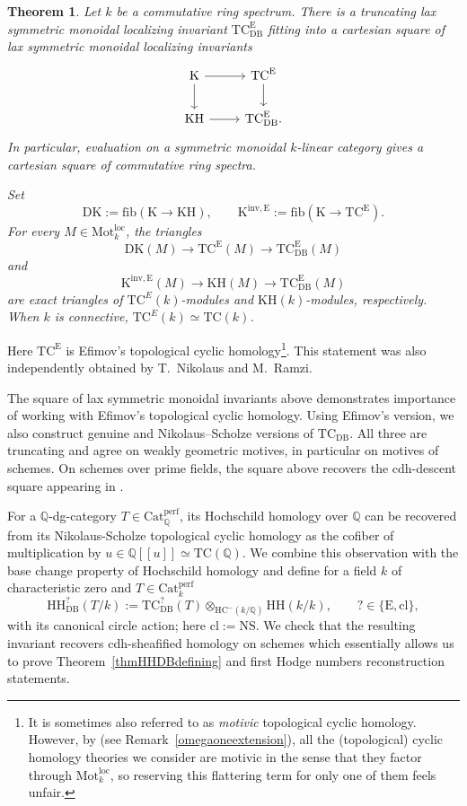 \documentclass{amsart}
\theoremstyle{plain}
\newtheorem{theorem}[prop]{Theorem}
\theoremstyle{definition}
\newcommand{\bbQ}{\mathbb{Q}}
\newcommand{\Catperf}{\mathrm{Cat}^{\mathrm{perf}}}
\newcommand{\Motloc}{\mathrm{Mot}^{\mathrm{loc}}}
\newcommand{\TC}{\mathrm{TC}}
\newcommand{\HH}{\mathrm{HH}}
\newcommand{\HC}{\mathrm{HC}}
\newcommand{\fib}{\mathrm{fib}}
\newcommand{\K}{\mathrm{K}}
\newcommand{\KH}{\mathrm{KH}}
\newcommand{\DK}{\mathrm{DK}}
\newcommand{\DB}{\mathrm{DB}}
\newcommand{\NS}{\mathrm{NS}}
\newcommand{\cl}{\mathrm{cl}}
\begin{document}
\begin{theorem}\label{thmintromultiplicative}
Let $k$ be a
commutative ring spectrum.
There is a truncating lax symmetric monoidal localizing invariant $\TC^{\mathrm E}_{\DB}$ fitting into a cartesian square of lax symmetric monoidal localizing invariants
\[
\begin{tikzcd}
\K\arrow[r]\arrow[d]
  &\TC^{\mathrm E}\arrow[d]\\
\KH\arrow[r]
  &\TC^{\mathrm E}_{\DB}.
\end{tikzcd}
\]
In particular, evaluation on a symmetric monoidal
$k$-linear category gives a cartesian square of commutative ring spectra.

Set
\[
\DK:=\fib(\K\to\KH),
\qquad
\K^{\mathrm{inv},\mathrm E}:=
\fib(\K\to\TC^{\mathrm E}).
\]
For every $M\in\Motloc_k$, the triangles
\[
\DK(M)\longrightarrow
\TC^{\mathrm E}(M)\longrightarrow
\TC^{\mathrm E}_{\DB}(M)
\]
and
\[
\K^{\mathrm{inv},\mathrm E}(M)\longrightarrow
\KH(M)\longrightarrow
\TC^{\mathrm E}_{\DB}(M)
\]
are exact triangles of $\TC^E(k)$-modules and
$\KH(k)$-modules, respectively. When $k$ is connective, $\TC^E(k)\simeq \TC(k)$.
\end{theorem}

Here $\TC^{\mathrm E}$ is Efimov's topological cyclic homology\footnote{It is sometimes also referred to as \emph{motivic} topological cyclic homology. However, by \cite{RSW25} (see Remark~\ref{omegaoneextension}), all the (topological) cyclic homology theories we consider are motivic in the sense that they factor through $\Motloc_k$, so reserving this flattering term for only one of them feels unfair.}.
This statement was also independently obtained by T.~Nikolaus and M.~Ramzi.

The square of lax symmetric monoidal invariants above demonstrates importance of working with Efimov's topological cyclic homology. Using Efimov's version, we also construct genuine and Nikolaus--Scholze versions of $\TC_{\DB}$. All three are truncating and agree on weakly geometric motives, in particular on motives of schemes. On schemes over prime fields, the square above recovers the cdh-descent square appearing in \cite{EM26}. 

For a $\bbQ$-dg-category $T\in\Catperf_\bbQ$, its Hochschild homology over $\bbQ$ can be recovered from its Nikolaus-Scholze topological cyclic homology as the cofiber of multiplication by $u\in\bbQ[[u]]\simeq\TC(\bbQ)$. We combine this observation with the base change property of Hochschild homology and define for a field $k$ of characteristic zero and $T\in\Catperf_k$
\[
\HH^?_{\DB}(T/k):=
\TC^?_{\DB}(T)
\otimes_{\HC^-(k/\bbQ)}\HH(k/k),
\qquad ?\in\{\mathrm E,\cl\},
\]
with its canonical circle action; here $\cl:=\NS$. We check that the resulting invariant recovers cdh-sheafified homology on schemes which essentially allows us to prove Theorem~\ref{thmHHDBdefining} and first Hodge numbers reconstruction statements.
\end{document}
